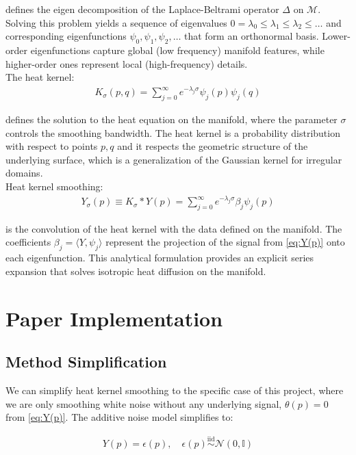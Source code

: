 \documentclass{article}
\begin{document}
\noindent defines the eigen decomposition of the Laplace-Beltrami operator $\Delta$ on $\mathcal{M}$. Solving this problem yields a sequence of eigenvalues $0 = \lambda_0 \leq \lambda_1 \leq \lambda_2 \leq \ldots$ and corresponding eigenfunctions $\psi_0, \psi_1, \psi_2, \ldots$ that form an orthonormal basis. Lower-order eigenfunctions capture global (low frequency) manifold features, while higher-order ones represent local (high-frequency) details.\\

The heat kernel:
\begin{align}\label{eq:heat-kernel}
     K_{\sigma}(p, q) = \sum_{j=0}^\infty e^{-\lambda_j\sigma} \psi_j(p) \psi_j(q)
\end{align}

\noindent defines the solution to the heat equation on the manifold, where the parameter $\sigma$ controls the smoothing bandwidth. The heat kernel is a probability distribution with respect to points $p, q$ and it respects the geometric structure of the underlying surface, which is a generalization of the Gaussian kernel for irregular domains.\\

Heat kernel smoothing:
\begin{align}
    Y_\sigma(p) \equiv K_{\sigma}  \ast Y(p) = \sum_{j=0}^\infty e^{-\lambda_j \sigma} \beta_j \psi_j(p)
\end{align}

\noindent is the convolution of the heat kernel with the data defined on the manifold. The coefficients  $\beta_j = \langle Y, \psi_j \rangle$ represent the projection of the signal from \eqref{eq:Y(p)} onto each eigenfunction. This analytical formulation provides an explicit series expansion that solves isotropic heat diffusion on the manifold.

\section{Paper Implementation}
\subsection{Method Simplification}
We can simplify heat kernel smoothing to the specific case of this project, where we are only smoothing white noise without any underlying signal,  $\theta(p) = 0$ from \eqref{eq:Y(p)}. The additive noise model simplifies to:

\begin{align}
Y(p) = \epsilon(p), \quad \epsilon(p) \overset{\text{iid}}{\sim} \mathcal{N}(0, \mathbb{I})
\end{align}
\end{document}
